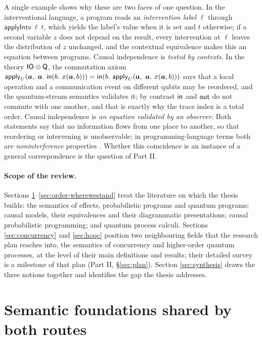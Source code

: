 A single example shows why these are two faces of one question. In the interventional language, a program reads an \emph{intervention label} $\ell$ through $\mathsf{applyIntv}\ \ell\ t$, which yields the label's value when it is set and $t$ otherwise; if a second variable $z$ does not depend on the result, every intervention at $\ell$ leaves the distribution of $z$ unchanged, and the contextual equivalence makes this an equation between programs. Causal independence is \emph{tested by contexts}. In the theory $\mathsf{IO}\otimes\mathsf{Q}$, the commutation axiom $\mathsf{apply}_{U}(\bm a,\ \bm a.\ \mathsf{in}(b.\ x(\bm a, b))) = \mathsf{in}(b.\ \mathsf{apply}_{U}(\bm a,\ \bm a.\ x(\bm a, b)))$ says that a local operation and a communication event on different qubits may be reordered, and the quantum-stream semantics validates it; by contrast $\mathsf{in}$ and $\mathsf{out}$ do not commute with one another, and that is exactly why the trace index is a total order. Causal independence is \emph{an equation validated by an observer}. Both statements say that no information flows from one place to another, so that reordering or intervening is unobservable; in programming-language terms both are \emph{noninterference} properties \cite{goguen1982noninterference}. Whether this coincidence is an instance of a general correspondence is the question of Part II.

\paragraph{Scope of the review.}
Sections \ref{sec:foundations}--\ref{sec:order-wherewestand} treat the literature on which the thesis builds: the semantics of effects, probabilistic programs and quantum programs; causal models, their equivalences and their diagrammatic presentations; causal probabilistic programming; and quantum process calculi. Sections \ref{sec:concurrency} and \ref{sec:hoqc} position two neighbouring fields that the research plan reaches into, the semantics of concurrency and higher-order quantum processes, at the level of their main definitions and results; their detailed survey is a milestone of that plan (Part II, \S\ref{sec:plan}). Section \ref{sec:synthesis} draws the three notions together and identifies the gap the thesis addresses.

\section{Semantic foundations shared by both routes}\label{sec:foundations}

